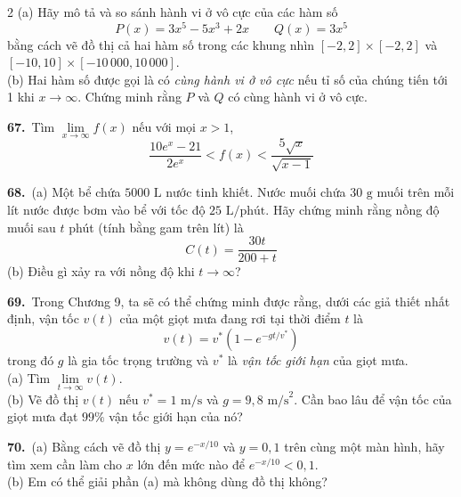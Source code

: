 \begin{multicols}{2}
(a) Hãy mô tả và so sánh hành vi ở vô cực của các hàm số
\[
P(x) = 3x^5 - 5x^3 + 2x \qquad Q(x) = 3x^5
\]
bằng cách vẽ đồ thị cả hai hàm số trong các khung nhìn $[-2, 2] \times [-2, 2]$ và $[-10, 10] \times [-10\,000, 10\,000]$.\\
(b) Hai hàm số được gọi là có \emph{cùng hành vi ở vô cực} nếu tỉ số của chúng tiến tới 1 khi $x \to \infty$. Chứng minh rằng $P$ và $Q$ có cùng hành vi ở vô cực.

\vspace{6pt}
\textbf{67.}\ Tìm $\lim\limits_{x \to \infty} f(x)$ nếu với mọi $x > 1$,
\[
\frac{10e^x - 21}{2e^x} < f(x) < \frac{5\sqrt{x}}{\sqrt{x - 1}}
\]

\vspace{4pt}
\textbf{68.}\ (a) Một bể chứa $5000\text{ L}$ nước tinh khiết. Nước muối chứa $30\text{ g}$ muối trên mỗi lít nước được bơm vào bể với tốc độ $25\text{ L/phút}$. Hãy chứng minh rằng nồng độ muối sau $t$ phút (tính bằng gam trên lít) là
\[
C(t) = \frac{30t}{200 + t}
\]
(b) Điều gì xảy ra với nồng độ khi $t \to \infty$?

\vspace{6pt}
\textbf{69.}\ Trong Chương 9, ta sẽ có thể chứng minh được rằng, dưới các giả thiết nhất định, vận tốc $v(t)$ của một giọt mưa đang rơi tại thời điểm $t$ là
\[
v(t) = v^*(1 - e^{-gt/v^*})
\]
trong đó $g$ là gia tốc trọng trường và $v^*$ là \emph{vận tốc giới hạn} của giọt mưa.\\
(a) Tìm $\lim\limits_{t \to \infty} v(t)$.\\
\marginicon(b) Vẽ đồ thị $v(t)$ nếu $v^* = 1\text{ m/s}$ và $g = 9{,}8\text{ m/s}^2$. Cần bao lâu để vận tốc của giọt mưa đạt $99\%$ vận tốc giới hạn của nó?

\vspace{6pt}
\marginicon\textbf{70.}\ (a) Bằng cách vẽ đồ thị $y = e^{-x/10}$ và $y = 0{,}1$ trên cùng một màn hình, hãy tìm xem cần làm cho $x$ lớn đến mức nào để $e^{-x/10} < 0{,}1$.\\
(b) Em có thể giải phần (a) mà không dùng đồ thị không?

\end{multicols}

\vfill
{}
